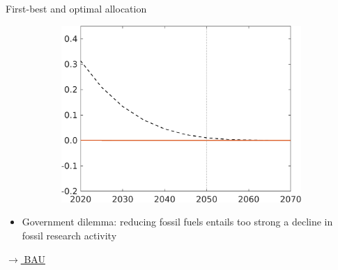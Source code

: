 \documentclass[11pt,aspectratio=169]{beamer}
\begin{document}
\begin{frame}{First-best and optimal allocation}
\begin{figure}[h!!]
\begin{subfigure}{0.45\textwidth}
			\includegraphics[width=1\textwidth]{../codding_model/own_basedOnFried/optimalPol_010922_revision/figures/all_13Sept22/NewCalib_effBauOpt_noBau_T_sffsg_Sun2_emnet1_spillover0_knspil3_xgr0_nsk0_sep0_extern0_PV1_etaa0.79_lgd0.png}
		\end{subfigure}
	\end{figure}
	\vspace{1mm}
	\begin{block}{}
		\begin{itemize}
			\item {Government dilemma: reducing fossil fuels entails too strong a decline in fossil research activity}
		\end{itemize}
	\end{block}	
\vspace{-5.7mm}
\hfill
\hyperlink{compfb}{\tiny{$\rightarrow$ BAU}}
\end{frame}
\end{document}
